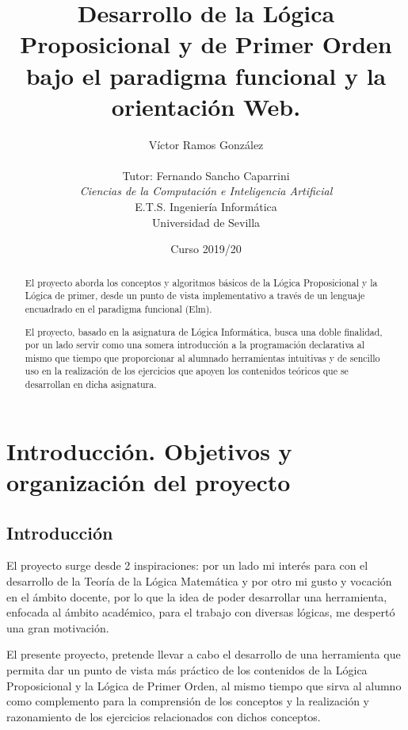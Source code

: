 \documentclass[a4paper]{report}
\title{Desarrollo de la Lógica Proposicional y de Primer Orden bajo el paradigma funcional y la orientación Web.}
\author{Víctor Ramos González\\\\
   Tutor: Fernando Sancho Caparrini\\
   \textit{Ciencias de la Computación e Inteligencia Artificial}\\
   E.T.S. Ingeniería Informática\\
   Universidad de Sevilla\\
  \vspace{8cm}
  \date{Curso 2019/20}
}
\def\blankpage{%
      \clearpage%
      \thispagestyle{empty}%
      \addtocounter{page}{0}%
      \null%
      \clearpage}
\begin{document}
\renewcommand{\tablename}{Tabla}
\renewcommand{\appendixname}{Anexo}
\renewcommand{\appendixtocname}{Anexos}
\renewcommand{\appendixpagename}{Anexos}

\newcommand{\toDo}{\fbox{TO DO}}
\dominitoc




\blankpage

\maketitle

\begin{abstract}

El proyecto aborda los conceptos y algoritmos básicos de la Lógica Proposicional y la Lógica de primer, desde un punto de vista implementativo a través de un lenguaje encuadrado en el paradigma funcional (Elm).

El proyecto, basado en la asignatura de Lógica Informática, busca una doble finalidad, por un lado servir como una somera introducción a la programación declarativa al mismo que tiempo que proporcionar al alumnado  herramientas intuitivas y de sencillo uso en la realización de los ejercicios que apoyen los contenidos teóricos que se desarrollan en dicha asignatura.
\end{abstract}

\tableofcontents

\newpage


\chapter{Introducción. Objetivos y organización del proyecto}
\renewcommand{\mtctitle}{}
\mtcskip
\minitoc
\newpage

\section{Introducción}

El proyecto surge desde 2 inspiraciones: por un lado mi interés para con el desarrollo de la Teoría de la Lógica Matemática y por otro mi gusto y vocación en el ámbito docente, por lo que la idea de poder desarrollar una herramienta, enfocada al ámbito académico, para el trabajo con diversas lógicas, me despertó una gran motivación.

El presente proyecto, pretende llevar a cabo el  desarrollo de una herramienta que permita dar un punto de vista más práctico de los contenidos de la Lógica Proposicional y la Lógica de Primer Orden, al mismo tiempo que sirva al alumno como complemento para la comprensión de los conceptos y la realización y razonamiento de los ejercicios relacionados con dichos conceptos.
\end{document}
